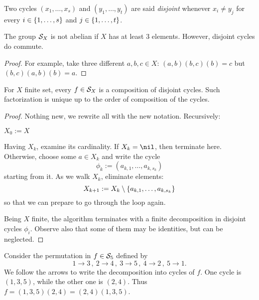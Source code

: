 Two cycles \(\left( x_1, \dots{}, x_s \right)\) and \(\left( y_1, \dots{}, y_t \right)\) are said {\em disjoint} whenever \(x_i \ne y_j\) for every \(i \in \left\{1, \dots{}, s\right\}\) and \(j \in \left\{1, \dots{}, t\right\}\).

\begin{proposition}
The group \(\mathcal S_X\) is not abelian if \(X\) has at least \(3\) elements. However, disjoint cycles do commute.
\end{proposition}

\begin{proof}
For example, take three different \(a, b, c \in X\): \((a, b) (b, c) (b) = c\) but \((b, c) (a, b) (b) = a\).
\end{proof}


\begin{proposition}\label{proposition:FactorInCycles}
For \(X\) finite set, every \(f \in \mathcal S_X\) is a composition of disjoint cycles. Such factorization is unique up to the order of composition of the cycles.
\end{proposition}

\begin{proof}
Nothing new, we rewrite all with the new notation. Recursively:
\begin{tcbenum}
\item \(X_0 := X\)
\item Having \(X_k\), examine its cardinality. If \(X_k = \nil\), then terminate here. Otherwise, choose some \(a \in X_k\) and write the cycle
\[\phi_k := \left(a_{k, 1}, \dots{}, a_{k, s_k}\right)\]
starting from it. As we walk \(X_k\), eliminate elements:
\[X_{k+1} := X_k \setminus \left\{a_{k, 1}, \dots{}, a_{k, s_k}\right\}\]
so that we can prepare to go through the loop again.
\end{tcbenum}
Being \(X\) finite, the algorithm terminates with a finite decomposition in disjoint cycles \(\phi_i\). Observe also that some of them may be identities, but can be neglected.
\end{proof}

\begin{example}
Consider the permutation in \(f \in \mathcal S_5\) defined by
\[1 \to 3 \,,\ 2 \to 4 \,,\ 3 \to 5 \,,\ 4 \to 2 \,,\ 5 \to 1 .\]
We follow the arrows to write the decomposition into cycles of \(f\). One cycle is \((1, 3, 5)\), while the other one is \((2, 4)\).
Thus \(f = (1, 3, 5)(2, 4) = (2, 4)(1, 3, 5)\). 
\end{example}

